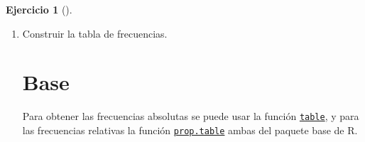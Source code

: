 \documentclass[
  spanish,
  a4paper,
]{scrreport}
\newenvironment{Shaded}{\begin{snugshade}}{\end{snugshade}}
\newcommand{\AttributeTok}[1]{\textcolor[rgb]{0.40,0.45,0.13}{#1}}
\newcommand{\FunctionTok}[1]{\textcolor[rgb]{0.28,0.35,0.67}{#1}}
\newcommand{\NormalTok}[1]{\textcolor[rgb]{0.00,0.23,0.31}{#1}}
\newcommand{\OtherTok}[1]{\textcolor[rgb]{0.00,0.23,0.31}{#1}}
\newcommand{\StringTok}[1]{\textcolor[rgb]{0.13,0.47,0.30}{#1}}
\theoremstyle{definition}
\newtheorem{exercise}{Ejercicio}[chapter]
\theoremstyle{remark}
\begin{document}
\begin{exercise}[]
\begin{enumerate}
\begin{tcolorbox}
  \section{tidyverse}

\begin{Shaded}
\begin{Highlighting}[]
\FunctionTok{library}\NormalTok{(tidyverse)}
\NormalTok{df }\OtherTok{\textless{}{-}} \FunctionTok{tibble}\NormalTok{(}\AttributeTok{grupo\_sanguineo =} \FunctionTok{c}\NormalTok{(}\StringTok{"A"}\NormalTok{, }\StringTok{"B"}\NormalTok{, }\StringTok{"B"}\NormalTok{, }\StringTok{"A"}\NormalTok{, }\StringTok{"AB"}\NormalTok{, }\StringTok{"0"}\NormalTok{, }\StringTok{"0"}\NormalTok{, }\StringTok{"A"}\NormalTok{, }\StringTok{"B"}\NormalTok{, }\StringTok{"B"}\NormalTok{, }\StringTok{"A"}\NormalTok{, }\StringTok{"A"}\NormalTok{, }\StringTok{"A"}\NormalTok{, }\StringTok{"A"}\NormalTok{, }\StringTok{"AB"}\NormalTok{, }\StringTok{"A"}\NormalTok{, }\StringTok{"A"}\NormalTok{, }\StringTok{"A"}\NormalTok{, }\StringTok{"B"}\NormalTok{, }\StringTok{"0"}\NormalTok{, }\StringTok{"B"}\NormalTok{, }\StringTok{"B"}\NormalTok{, }\StringTok{"B"}\NormalTok{, }\StringTok{"A"}\NormalTok{, }\StringTok{"A"}\NormalTok{, }\StringTok{"A"}\NormalTok{, }\StringTok{"0"}\NormalTok{, }\StringTok{"A"}\NormalTok{, }\StringTok{"AB"}\NormalTok{, }\StringTok{"0"}\NormalTok{))}
\end{Highlighting}
\end{Shaded}

  \end{tcolorbox}
\item
  Construir la tabla de frecuencias.

  \begin{tcolorbox}[enhanced jigsaw, titlerule=0mm, arc=.35mm, rightrule=.15mm, opacitybacktitle=0.6, leftrule=.75mm, colframe=quarto-callout-tip-color-frame, toptitle=1mm, breakable, colbacktitle=quarto-callout-tip-color!10!white, bottomrule=.15mm, colback=white, left=2mm, bottomtitle=1mm, opacityback=0, title=\textcolor{quarto-callout-tip-color}{\faLightbulb}\hspace{0.5em}{Solución}, toprule=.15mm, coltitle=black]

  \section{Base}

  Para obtener las frecuencias absolutas se puede usar la función
  \href{https://www.rdocumentation.org/packages/base/versions/3.6.2/topics/table}{\texttt{table}},
  y para las frecuencias relativas la función
  \href{https://www.rdocumentation.org/packages/base/versions/3.6.2/topics/prop.table}{\texttt{prop.table}}
  ambas del paquete base de R.


\end{tcolorbox}
\end{enumerate}
\end{exercise}
\end{document}

